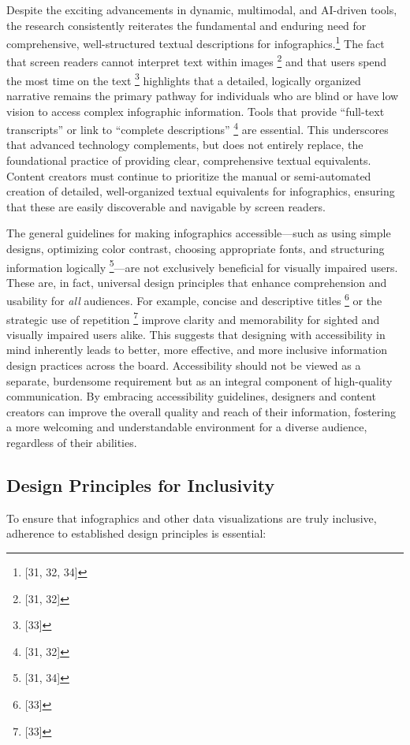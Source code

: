 Despite the exciting advancements in dynamic, multimodal, and AI-driven tools, the research consistently reiterates the fundamental and enduring need for comprehensive, well-structured textual descriptions for infographics.\footnote{[31, 32, 34]} The fact that screen readers cannot interpret text within images \footnote{[31, 32]} and that users spend the most time on the text \footnote{[33]} highlights that a detailed, logically organized narrative remains the primary pathway for individuals who are blind or have low vision to access complex infographic information. Tools that provide ``full-text transcripts'' or link to ``complete descriptions'' \footnote{[31, 32]} are essential. This underscores that advanced technology complements, but does not entirely replace, the foundational practice of providing clear, comprehensive textual equivalents. Content creators must continue to prioritize the manual or semi-automated creation of detailed, well-organized textual equivalents for infographics, ensuring that these are easily discoverable and navigable by screen readers.

The general guidelines for making infographics accessible---such as using simple designs, optimizing color contrast, choosing appropriate fonts, and structuring information logically \footnote{[31, 34]}---are not exclusively beneficial for visually impaired users. These are, in fact, universal design principles that enhance comprehension and usability for \textit{all} audiences. For example, concise and descriptive titles \footnote{[33]} or the strategic use of repetition \footnote{[33]} improve clarity and memorability for sighted and visually impaired users alike. This suggests that designing with accessibility in mind inherently leads to better, more effective, and more inclusive information design practices across the board. Accessibility should not be viewed as a separate, burdensome requirement but as an integral component of high-quality communication. By embracing accessibility guidelines, designers and content creators can improve the overall quality and reach of their information, fostering a more welcoming and understandable environment for a diverse audience, regardless of their abilities.

\subsection{Design Principles for Inclusivity}
To ensure that infographics and other data visualizations are truly inclusive, adherence to established design principles is essential:

